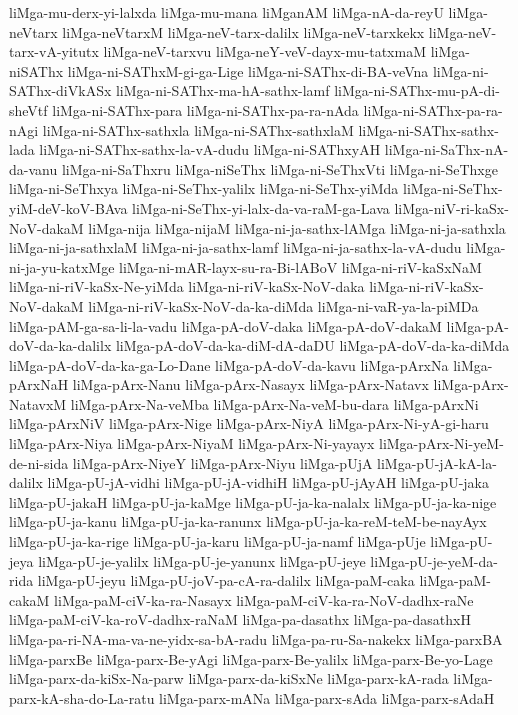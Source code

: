 {liMga-mu-derx-yi-lalxda
liMga-mu-mana
liMganAM
liMga-nA-da-reyU
liMga-neVtarx
liMga-neVtarxM
liMga-neV-tarx-dalilx
liMga-neV-tarxkekx
liMga-neV-tarx-vA-yitutx
liMga-neV-tarxvu
liMga-neY-veV-dayx-mu-tatxmaM
liMga-niSAThx
liMga-ni-SAThxM-gi-ga-Lige
liMga-ni-SAThx-di-BA-veVna
liMga-ni-SAThx-diVkASx
liMga-ni-SAThx-ma-hA-sathx-lamf
liMga-ni-SAThx-mu-pA-di-sheVtf
liMga-ni-SAThx-para
liMga-ni-SAThx-pa-ra-nAda
liMga-ni-SAThx-pa-ra-nAgi
liMga-ni-SAThx-sathxla
liMga-ni-SAThx-sathxlaM
liMga-ni-SAThx-sathx-lada
liMga-ni-SAThx-sathx-la-vA-dudu
liMga-ni-SAThxyAH
liMga-ni-SaThx-nA-da-vanu
liMga-ni-SaThxru
liMga-niSeThx
liMga-ni-SeThxVti
liMga-ni-SeThxge
liMga-ni-SeThxya
liMga-ni-SeThx-yalilx
liMga-ni-SeThx-yiMda
liMga-ni-SeThx-yiM-deV-koV-BAva
liMga-ni-SeThx-yi-lalx-da-va-raM-ga-Lava
liMga-niV-ri-kaSx-NoV-dakaM
liMga-nija
liMga-nijaM
liMga-ni-ja-sathx-lAMga
liMga-ni-ja-sathxla
liMga-ni-ja-sathxlaM
liMga-ni-ja-sathx-lamf
liMga-ni-ja-sathx-la-vA-dudu
liMga-ni-ja-yu-katxMge
liMga-ni-mAR-layx-su-ra-Bi-lABoV
liMga-ni-riV-kaSxNaM
liMga-ni-riV-kaSx-Ne-yiMda
liMga-ni-riV-kaSx-NoV-daka
liMga-ni-riV-kaSx-NoV-dakaM
liMga-ni-riV-kaSx-NoV-da-ka-diMda
liMga-ni-vaR-ya-la-piMDa
liMga-pAM-ga-sa-li-la-vadu
liMga-pA-doV-daka
liMga-pA-doV-dakaM
liMga-pA-doV-da-ka-dalilx
liMga-pA-doV-da-ka-diM-dA-daDU
liMga-pA-doV-da-ka-diMda
liMga-pA-doV-da-ka-ga-Lo-Dane
liMga-pA-doV-da-kavu
liMga-pArxNa
liMga-pArxNaH
liMga-pArx-Nanu
liMga-pArx-Nasayx
liMga-pArx-Natavx
liMga-pArx-NatavxM
liMga-pArx-Na-veMba
liMga-pArx-Na-veM-bu-dara
liMga-pArxNi
liMga-pArxNiV
liMga-pArx-Nige
liMga-pArx-NiyA
liMga-pArx-Ni-yA-gi-haru
liMga-pArx-Niya
liMga-pArx-NiyaM
liMga-pArx-Ni-yayayx
liMga-pArx-Ni-yeM-de-ni-sida
liMga-pArx-NiyeY
liMga-pArx-Niyu
liMga-pUjA
liMga-pU-jA-kA-la-dalilx
liMga-pU-jA-vidhi
liMga-pU-jA-vidhiH
liMga-pU-jAyAH
liMga-pU-jaka
liMga-pU-jakaH
liMga-pU-ja-kaMge
liMga-pU-ja-ka-nalalx
liMga-pU-ja-ka-nige
liMga-pU-ja-kanu
liMga-pU-ja-ka-ranunx
liMga-pU-ja-ka-reM-teM-be-nayAyx
liMga-pU-ja-ka-rige
liMga-pU-ja-karu
liMga-pU-ja-namf
liMga-pUje
liMga-pU-jeya
liMga-pU-je-yalilx
liMga-pU-je-yanunx
liMga-pU-jeye
liMga-pU-je-yeM-da-rida
liMga-pU-jeyu
liMga-pU-joV-pa-cA-ra-dalilx
liMga-paM-caka
liMga-paM-cakaM
liMga-paM-ciV-ka-ra-Nasayx
liMga-paM-ciV-ka-ra-NoV-dadhx-raNe
liMga-paM-ciV-ka-roV-dadhx-raNaM
liMga-pa-dasathx
liMga-pa-dasathxH
liMga-pa-ri-NA-ma-va-ne-yidx-sa-bA-radu
liMga-pa-ru-Sa-nakekx
liMga-parxBA
liMga-parxBe
liMga-parx-Be-yAgi
liMga-parx-Be-yalilx
liMga-parx-Be-yo-Lage
liMga-parx-da-kiSx-Na-parw
liMga-parx-da-kiSxNe
liMga-parx-kA-rada
liMga-parx-kA-sha-do-La-ratu
liMga-parx-mANa
liMga-parx-sAda
liMga-parx-sAdaH
}
